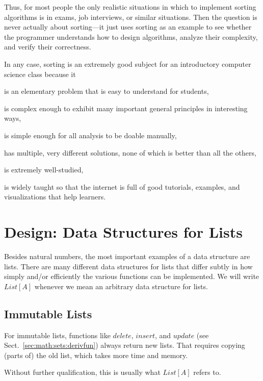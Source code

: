 Thus, for most people the only realistic situations in which to implement sorting algorithms is in exams, job interviews, or similar situations.
Then the question is never actually about sorting---it just uses sorting as an example to see whether the programmer understands how to design algorithms, analyze their complexity, and verify their correctness.

In any case, sorting is an extremely good subject for an introductory computer science class because it
\begin{compactitem}
 \item is an elementary problem that is easy to understand for students,
 \item is complex enough to exhibit many important general principles in interesting ways,
 \item is simple enough for all analysis to be doable manually,
 \item has multiple, very different solutions, none of which is better than all the others,
 \item is extremely well-studied,
 \item is widely taught so that the internet is full of good tutorials, examples, and visualizations that help learners.
\end{compactitem}


\section{Design: Data Structures for Lists}\label{sec:ad:list:ds}


Besides natural numbers, the most important examples of a data structure are lists.
There are many different data structures for lists that differ subtly in how simply and/or efficiently the various functions can be implemented.
We will write $List[A]$ whenever we mean an arbitrary data structure for lists.

\subsection{Immutable Lists}

For immutable lists, functions like $delete$, $insert$, and $update$ (see Sect.~\ref{sec:math:sets:derivfun}) always return new lists.
That requires copying (parts of) the old list, which takes more time and memory.

Without further qualification, this is usually what $List[A]$ refers to.

